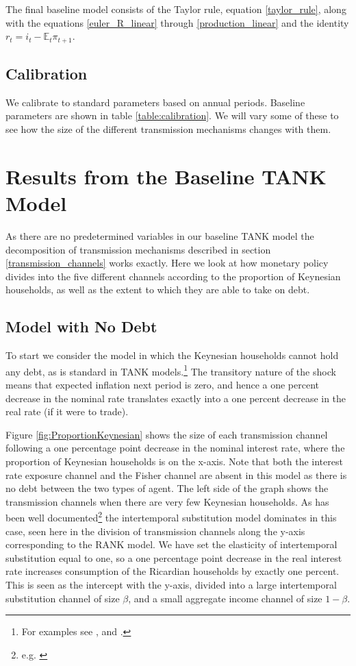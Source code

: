 \documentclass[titlepage]{\econtex}\newcommand{\texname}{ConsumptionHeterogeneity}
\begin{document}
The final baseline model consists of the Taylor rule, equation \ref{taylor_rule}, along with the equations \ref{euler_R_linear} through \ref{production_linear} and the identity $r_t = i_t - \mathbb{E}_t \pi_{t+1}$.

\subsection{Calibration}
We calibrate to standard parameters based on annual periods. Baseline parameters are shown in table \ref{table:calibration}. We will vary some of these to see how the size of the different transmission mechanisms changes with them.



\section{Results from the Baseline TANK Model}
As there are no predetermined variables in our baseline TANK model the decomposition of transmission mechanisms described in section \ref{transmission_channels} works exactly. Here we look at how monetary policy divides into the five different channels according to the proportion of Keynesian households, as well as the extent to which they are able to take on debt.

\subsection{Model with No Debt}
To start we consider the model in which the Keynesian households cannot hold any debt, as is standard in TANK models.\footnote{For examples see \cite{dgHANKTANK}, \cite{gali_understanding_2007} and \cite{broer_2018}.} The transitory nature of the shock means that expected inflation next period is zero, and hence a one percent decrease in the nominal rate translates exactly into a one percent decrease in the real rate (if it were to trade).

Figure \ref{fig:ProportionKeynesian} shows the size of each transmission channel following a one percentage point decrease in the nominal interest rate, where the proportion of Keynesian households is on the x-axis. Note that both the interest rate exposure channel and the Fisher channel are absent in this model as there is no debt between the two types of agent. The left side of the graph shows the transmission channels when there are very few Keynesian households. As has been well documented\footnote{e.g. \cite{kaplan_monetary_2016}} the intertemporal substitution model dominates in this case, seen here in the division of transmission channels along the y-axis corresponding to the RANK model. We have set the elasticity of intertemporal substitution equal to one, so a one percentage point decrease in the real interest rate increases consumption of the Ricardian households by exactly one percent. This is seen as the intercept with the y-axis, divided into a large intertemporal substitution channel of size $\beta$, and a small aggregate income channel of size $1-\beta$.
\end{document}
